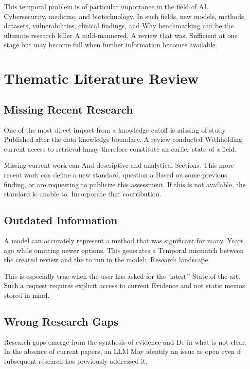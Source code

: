 \documentclass[acmsmall,screen]{acmart}
\begin{document}
This temporal problem is of particular importance in the field of AI.
Cybersecurity, medicine, and biotechnology. In such fields, new
models, methods, datasets, vulnerabilities, clinical findings, and
Why benchmarking can be the ultimate research killer A mild-mannered. A review that was.
Sufficient at one stage but may become full when further information becomes available.

\section{Thematic Literature Review}

\subsection{Missing Recent Research}

One of the most direct impact from a knowledge cutoff is missing of study
Published after the data knowledge boundary. A review conducted
Withholding current access to retrieval hmay therefore constitute an earlier state of a
field.

Missing current work can And descriptive and analytical
Sections. This more recent work can define a new standard, question a
Based on some previous finding, or are requesting to publicize this assessment. If this is not available, the standard is unable to.
Incorporate that contribution.

\subsection{Outdated Information}

A model can accurately represent a method that was significant for many.
Years ago while omitting newer options. This generates a
Temporal mismatch between the created review and the to run in the model:.
Research landscape.

This is especially true when the user has asked for the `latest''
State of the art. Such a request requires explicit access to current
Evidence and not static memos stored in mind.

\subsection{Wrong Research Gaps}

Research gaps emerge from the synthesis of evidence and
De in what is not clear. In the absence of current papers, an LLM
May identify an issue as open even if subsequent research has previously
addressed it.
\end{document}
